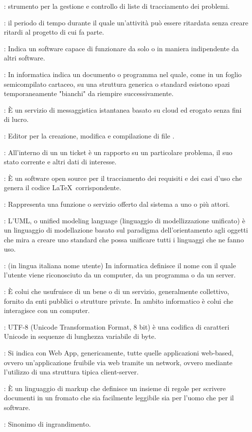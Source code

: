 {		: strumento per la gestione e controllo di liste di tracciamento dei problemi.

		: il periodo di tempo durante il quale un'attività può essere ritardata senza creare ritardi al progetto di cui fa parte.

		: Indica un software capace di funzionare da solo o in maniera indipendente da altri software.


		: In informatica indica un documento o programma nel quale, come in un foglio semicompilato cartaceo, su una struttura generica o standard esistono spazi temporaneamente "bianchi" da riempire successivamente.

		: È un servizio di messaggistica istantanea basato su cloud ed erogato senza fini di lucro.

		: Editor per la creazione, modifica e compilazione di file \glossaryItem{\LaTeX\ }.

		: All'interno di un  un ticket è un rapporto su un particolare problema, il suo stato corrente e altri dati di interesse.

		: È un software open source per il tracciamento dei requisiti e dei casi d'uso che genera il codice \LaTeX\ corrispondente.


		: Rappresenta una funzione o servizio offerto dal sistema a uno o più attori.

		: L'UML, o unified modeling language (linguaggio di modellizzazione unificato) è un linguaggio di modellazione basato sul paradigma dell'orientamento agli oggetti
		che mira a creare uno standard che possa unificare tutti i linguaggi che ne fanno uso.

		: (in lingua italiana nome utente) In informatica definisce il nome con il quale l'utente viene riconosciuto da un computer, da un programma o da un server.

		: È colui che usufruisce di un bene o di un servizio, generalmente collettivo, fornito da enti pubblici o strutture private. In ambito informatico è colui che interagisce con un computer.

		: UTF-8 (Unicode Transformation Format, 8 bit) è una codifica di caratteri Unicode in sequenze di lunghezza variabile di byte.


		: Si indica con Web App, genericamente, tutte quelle applicazioni web-based, ovvero un'applicazione fruibile via web tramite un network, ovvero
		mediante l'utilizzo di una struttura tipica client-server.

		: È un linguaggio di markup che definisce un insieme di regole per scrivere documenti in un fromato che sia facilmente leggibile sia per l'uomo che per il software.


		: Sinonimo di ingrandimento.
	 }

